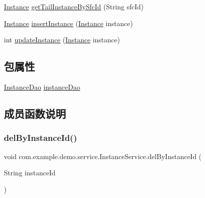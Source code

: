 \begin{DoxyCompactItemize}
\mbox{\hyperlink{classcom_1_1example_1_1demo_1_1modular_1_1_instance}{Instance}} \mbox{\hyperlink{classcom_1_1example_1_1demo_1_1service_1_1_instance_service_a6af21882056bc8af57590a4cbc565990}{get\+Tail\+Instance\+By\+Sfc\+Id}} (String sfc\+Id)
\item 
\mbox{\hyperlink{classcom_1_1example_1_1demo_1_1modular_1_1_instance}{Instance}} \mbox{\hyperlink{classcom_1_1example_1_1demo_1_1service_1_1_instance_service_a97bd94443aad5f776f493a7b94ce3420}{insert\+Instance}} (\mbox{\hyperlink{classcom_1_1example_1_1demo_1_1modular_1_1_instance}{Instance}} instance)
\item 
int \mbox{\hyperlink{classcom_1_1example_1_1demo_1_1service_1_1_instance_service_a43a84a71d2d32d56092e61668e8e0aaf}{update\+Instance}} (\mbox{\hyperlink{classcom_1_1example_1_1demo_1_1modular_1_1_instance}{Instance}} instance)
\end{DoxyCompactItemize}
\subsection*{包属性}
\begin{DoxyCompactItemize}
\item 
\mbox{\hyperlink{interfacecom_1_1example_1_1demo_1_1dao_1_1_instance_dao}{Instance\+Dao}} \mbox{\hyperlink{classcom_1_1example_1_1demo_1_1service_1_1_instance_service_a17c9d6e96ef4007013ae6efc47840aaf}{instance\+Dao}}
\end{DoxyCompactItemize}


\subsection{成员函数说明}
\mbox{\label{classcom_1_1example_1_1demo_1_1service_1_1_instance_service_a1cfe7a3871f2bd61c6aecae228b32c1b}} 
\subsubsection{\texorpdfstring{del\+By\+Instance\+Id()}{delByInstanceId()}}
{\footnotesize\ttfamily void com.\+example.\+demo.\+service.\+Instance\+Service.\+del\+By\+Instance\+Id (\begin{DoxyParamCaption}\item[{String}]{instance\+Id }\end{DoxyParamCaption})}

